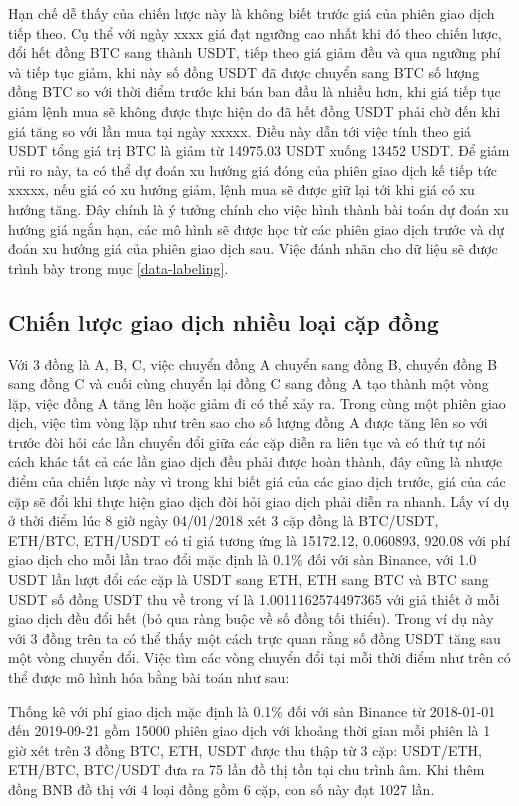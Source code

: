 Hạn chế dễ thấy của chiến lược này là không biết trước giá của phiên giao dịch tiếp theo. Cụ thể với ngày xxxx giá đạt ngưỡng cao nhất khi đó theo chiến lược, đổi hết đồng BTC sang thành USDT, tiếp theo giá giảm đều và qua ngưỡng phí và tiếp tục giảm, khi này số đồng USDT đã được chuyển sang BTC số lượng đồng BTC so với thời điểm trước khi bán ban đầu là nhiều hơn, khi giá tiếp tục giảm lệnh mua sẽ không được thực hiện do đã hết đồng USDT phải chờ đến khi giá tăng so với lần mua tại ngày xxxxx. Điều này dẫn tới việc tính theo giá USDT tổng giá trị BTC là giảm từ 14975.03 USDT xuống 13452 USDT. Để giảm rủi ro này, ta có thể dự đoán xu hướng giá đóng của phiên giao dịch kế tiếp tức xxxxx, nếu giá có xu hướng giảm, lệnh mua sẽ được giữ lại tới khi giá có xu hướng tăng. Đây chính là ý tưởng chính cho việc hình thành bài toán dự đoán xu hướng giá ngắn hạn, các mô hình sẽ được học từ các phiên giao dịch trước và dự đoán xu hướng giá của phiên giao dịch sau. Việc đánh nhãn cho dữ liệu sẽ được trình bày trong mục \ref{data-labeling}.
 
 
 \subsection{Chiến lược giao dịch nhiều loại cặp đồng}
  Với 3 đồng là A, B, C, việc chuyển đồng A chuyển sang đồng B, chuyển đồng B sang đồng C và cuối cùng chuyển lại đồng C sang đồng A tạo thành một vòng lặp, việc đồng A tăng lên hoặc giảm đi có thể xảy ra. Trong cùng một phiên giao dịch, việc tìm vòng lặp như trên sao cho số lượng đồng A được tăng lên so với trước đòi hỏi các lần chuyển đổi giữa các cặp diễn ra liên tục và có thứ tự nói cách khác tất cả các lần giao dịch đều phải được hoàn thành, đây cũng là nhược điểm của chiến lược này vì trong khi biết giá của các giao dịch trước, giá của các cặp sẽ đổi khi thực hiện giao dịch đòi hỏi giao dịch phải diễn ra nhanh.
  Lấy ví dụ ở thời điểm lúc 8 giờ ngày 04/01/2018 xét 3 cặp đồng là BTC/USDT, ETH/BTC, ETH/USDT có tỉ giá tương ứng là 15172.12, 0.060893, 920.08 với phí giao dịch cho mỗi lần trao đổi mặc định là 0.1\% đối với sàn Binance, với 1.0 USDT lần lượt đổi các cặp là USDT sang ETH, ETH sang BTC và BTC sang USDT số đồng USDT thu về trong ví là 1.0011162574497365 với giả thiết ở mỗi giao dịch đều đổi hết (bỏ qua ràng buộc về số đồng tối thiểu). Trong ví dụ này với 3 đồng trên ta có thể thấy một cách trực quan rằng số đồng USDT tăng sau một vòng chuyển đổi. Việc tìm các vòng chuyển đổi tại mỗi thời điểm như trên có thể  được mô hình hóa bằng bài toán như sau:
  
  Thống kê với phí giao dịch mặc định là 0.1\% đối với sàn Binance từ 2018-01-01 đến 2019-09-21 gồm 15000 phiên giao dịch với khoảng thời gian mỗi phiên là 1 giờ xét trên 3 đồng BTC, ETH, USDT được thu thập từ 3 cặp: USDT/ETH, ETH/BTC, BTC/USDT đưa ra 75 lần đồ thị tồn tại chu trình âm. Khi thêm đồng BNB đồ thị với 4 loại đồng gồm 6 cặp, con số này đạt 1027 lần.
  
